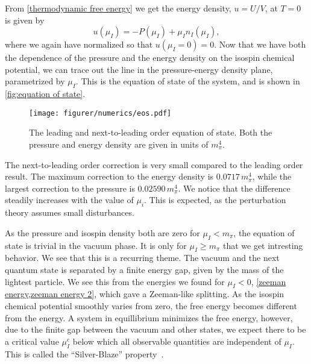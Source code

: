 From \cref{thermodynamic free energy} we get the energy density, $u = U/V$, at $T = 0$ is given by
\begin{equation}
    u(\mu_I) = -P(\mu_I) + \mu_I n_I(\mu_I),
\end{equation}
where we again have normalized so that $u(\mu_I = 0) = 0$.
Now that we have both the dependence of the pressure and the energy density on the isospin chemical potential, we can trace out the line in the pressure-energy density plane, parametrized by $\mu_I$.
This is the equation of state of the system, and is shown in \autoref{fig:equation of state}.

\begin{figure}[h]
    \centering
    \vspace{-0.2cm}
    \texttt{[image: figurer/numerics/eos.pdf]}
    \caption{The leading and next-to-leading order equation of state. Both the pressure and energy density are given in units of $m_\pi^4$.}
    \label{fig:equation of state}
\end{figure}


The next-to-leading order correction is very small compared to the leading order result.
The maximum correction to the energy density is $0.0717 \, m_\pi^4$, while the largest correction to the pressure is $0.02590\, m_\pi^4$.
We notice that the difference steadily increases with the value of $\mu_i$.
This is expected, as the perturbation theory assumes small disturbances.

As the pressure and isospin density both are zero for $\mu_I < m_\pi$, the equation of state is trivial in the vacuum phase.
It is only for $\mu_I \geq m_\pi$ that we get intresting behavior.
We see that this is a recurring theme.
The vacuum and the next quantum state is separated by a finite energy gap, given by the mass of the lightest particle.
We see this from the energies we found for $\mu_I < 0$, \cref{zeeman energy,zeeman energy 2}, which gave a Zeeman-like splitting.
As the isospin chemical potential smoothly varies from zero, the free energy becomes different from the energy.
A system in equillibrium minimizes the free energy, however, due to the finite gap between the vacuum and other states, we expect there to be a critical value $\mu_I^c$ below which all observable quantities are independent of $\mu_I$.
This is called the ``Silver-Blaze'' property~\cite{cohen:silver-blaze,cohen2}.


\FloatBarrier

